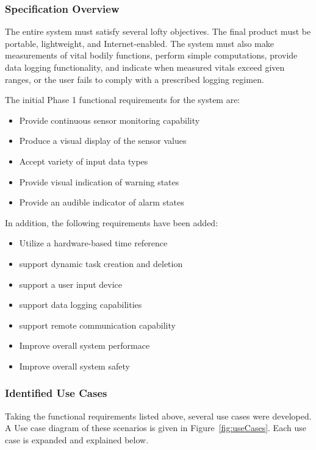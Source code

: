 \documentclass[12pt]{article} %
\begin{document}
\subsubsection{Specification Overview}
The entire system must satisfy several lofty objectives. The final product must
be portable, lightweight, and Internet-enabled. The system must also make
measurements of vital bodily functions, perform simple computations, provide
data logging functionality, and indicate when measured vitals exceed given
ranges, or the user fails to comply with a prescribed logging regimen. \\

\begin{itemize}[$$]
  \item The initial Phase 1 functional requirements for the system are:
    \begin{itemize}[$\bullet$]
      \item Provide continuous sensor monitoring capability
      \item Produce a visual display of the sensor values
      \item Accept variety of input data types
      \item Provide visual indication of warning states
      \item Provide an audible indicator of alarm states
    \end{itemize}
  \item In addition, the following requirements have been added:
    \begin{itemize}[$\bullet$]
      \item Utilize a hardware-based time reference
      \item support dynamic task creation and deletion
      \item support a user input device
      \item support data logging capabilities
      \item support remote communication capability
      \item Improve overall system performace
      \item Improve overall system safety
    \end{itemize}
\end{itemize}

\subsubsection{Identified Use Cases}
Taking the functional requirements listed above, several use cases were
developed. A Use case diagram of these scenarios is given in
Figure~\ref{fig:useCases}. Each use case is expanded and explained below.
\end{document}
